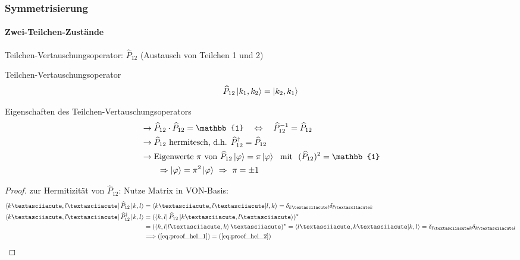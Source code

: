 \subsubsection{Symmetrisierung}
\paragraph{Zwei-Teilchen-Zustände}
Teilchen-Vertauschungsoperator: $\widehat{P}_{12}$ (Austausch von Teilchen 1 und 2)

\begin{definition}{Teilchen-Vertauschungsoperator}
        \begin{align}
            \widehat{P}_{12} \ket{k_1,k_2} = \ket{k_2,k_1}
        \end{align}
\end{definition}
\begin{prop}{Eigenschaften des Teilchen-Vertauschungsoperators}
    \begin{align}
         &\rightarrow \widehat{P}_{12}\cdot \widehat{P}_{12} = \mathbb{1} \quad \Leftrightarrow \quad \widehat{P}_{12}^{-1} = \widehat{P}_{12}\\
            &\rightarrow \widehat{P}_{12} \text{ hermitesch, d.h. } \widehat{P}_{12}^{\dagger} = \widehat{P}_{12} \\
            &\rightarrow \text{Eigenwerte $\pi$ von }  \widehat{P}_{12} \ket{\varphi} = \pi \ket{\varphi} \ \text{ mit } \ (\widehat{P}_{12})^2 = \mathbb{1}\\
            &\qquad \Rightarrow \ket{\varphi} = \pi^2 \ket{\varphi} \ \Rightarrow \ \pi = \pm 1
    \end{align}
\end{prop}
\begin{proof}
    zur Hermitizität von $\widehat{P}_{12}$: Nutze Matrix in VON-Basis:
    \begin{align}
        \bra{k´,l´} \widehat{P}_{12} \ket{k,l} &= \bra{k´,l´}\ket{l,k} = \delta_{k´l}\delta_{l´k}  \label{eq:proof_hel_1}\\
        \bra{k´,l´} \widehat{P}_{12}^{\dagger} \ket{k,l} &= (\bra{k,l}\widehat{P}_{12}\ket{k´,l´})^* \\
        &= (\bra{k,l}\ket{l´,k}´)^* =\bra{l´,k´}\ket{k,l} = \delta_{l´k}\delta_{k´l} \label{eq:proof_hel_2}\\
        &\Longrightarrow (\ref{eq:proof_hel_1}) = (\ref{eq:proof_hel_2})
    \end{align}
\end{proof}

